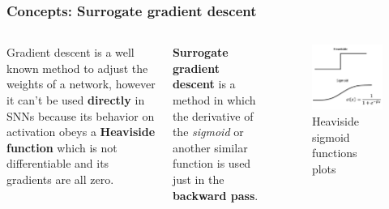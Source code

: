 \begin{frame}
	\frametitle{Concepts: Surrogate gradient descent}
		\begin{columns}
			\par Gradient descent is a well known method to adjust the weights of a network, however it can't be used \textbf{directly} in SNNs because its behavior on activation obeys a \textbf{Heaviside function} which is not differentiable and its gradients are all zero.\newline
			
			\par \textbf{Surrogate gradient descent} is a method in which the derivative of the \textit{sigmoid} or another similar function is used just in the \textbf{backward pass}.
			
			
			\begin{figure}
				\centering
				\includegraphics[width=0.9\linewidth]{images/heavisideSigmoid}
				\caption{Heaviside sigmoid functions plots}
				\label{fig:heavisidesigmoid}
			\end{figure}
	\end{columns}
\end{frame}

